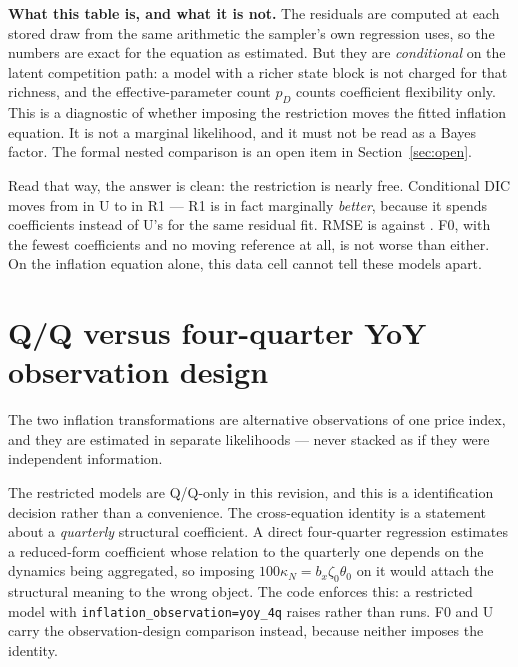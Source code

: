 \documentclass[11pt]{article}
\newcommand{\code}[1]{\texttt{#1}}
\begin{document}
\par\medskip

\label{tab:fit}

\par\medskip\noindent
\textbf{What this table is, and what it is not.} The residuals are computed at
each stored draw from the same arithmetic the sampler's own regression uses, so
the numbers are exact for the equation as estimated. But they are
\emph{conditional} on the latent competition path: a model with a richer state
block is not charged for that richness, and the effective-parameter count $p_D$
counts coefficient flexibility only. This is a diagnostic of whether imposing
the restriction moves the fitted inflation equation. It is not a marginal
likelihood, and it must not be read as a Bayes factor. The formal nested
comparison is an open item in Section~\ref{sec:open}.

Read that way, the answer is clean: the restriction is nearly free. Conditional
DIC moves from \TheoryUConditionalDIC{} in U to \TheoryROneConditionalDIC{} in
R1 --- R1 is in fact marginally \emph{better}, because it spends
\TheoryROneFreeCoefficients{} coefficients instead of U's
\TheoryUFreeCoefficients{} for the same residual fit. RMSE is
\TheoryURmse{} against \TheoryROneRmse. F0, with the fewest coefficients and no
moving reference at all, is not worse than either. On the inflation equation
alone, this data cell cannot tell these models apart.

\section{Q/Q versus four-quarter YoY observation design}
The two inflation transformations are alternative observations of one price
index, and they are estimated in separate likelihoods --- never stacked as if
they were independent information.

The restricted models are Q/Q-only in this revision, and this is a
identification decision rather than a convenience. The cross-equation identity
is a statement about a \emph{quarterly} structural coefficient. A direct
four-quarter regression estimates a reduced-form coefficient whose relation to
the quarterly one depends on the dynamics being aggregated, so imposing
$100\kappa_N=b_x\zeta_0\theta_0$ on it would attach the structural meaning to
the wrong object. The code enforces this: a restricted model with
\code{inflation\_observation=yoy\_4q} raises rather than runs. F0 and U carry the
observation-design comparison instead, because neither imposes the identity.
\end{document}
